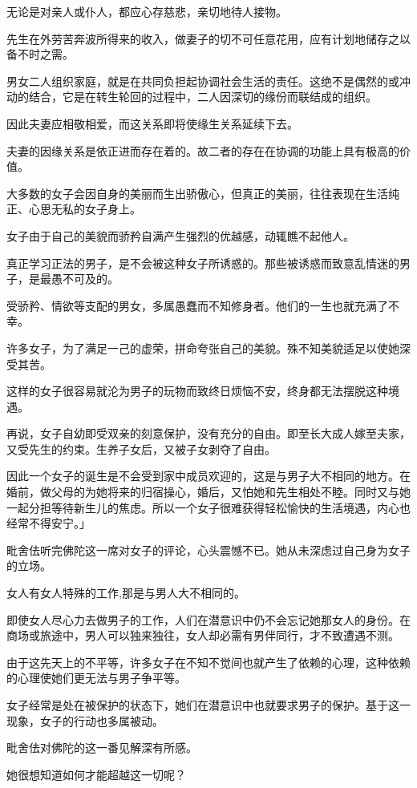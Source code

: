 \documentclass[twoside,openany]{book}
\begin{document}
无论是对亲人或仆人，都应心存慈悲，亲切地待人接物。

先生在外劳苦奔波所得来的收入，做妻子的切不可任意花用，应有计划地储存之以备不时之需。

男女二人组织家庭，就是在共同负担起协调社会生活的责任。这绝不是偶然的或冲动的结合，它是在转生轮回的过程中，二人因深切的缘份而联结成的组织。

因此夫妻应相敬相爱，而这关系即将使缘生关系延续下去。

夫妻的因缘关系是依正进而存在着的。故二者的存在在协调的功能上具有极高的价值。

大多数的女子会因自身的美丽而生出骄傲心，但真正的美丽，往往表现在生活纯正、心思无私的女子身上。

女子由于自己的美貌而骄矜自满产生强烈的优越感，动辄瞧不起他人。

真正学习正法的男子，是不会被这种女子所诱惑的。那些被诱惑而致意乱情迷的男子，是最愚不可及的。

受骄矜、情欲等支配的男女，多属愚蠢而不知修身者。他们的一生也就充满了不幸。

许多女子，为了满足一己的虚荣，拼命夸张自己的美貌。殊不知美貌适足以使她深受其苦。

这样的女子很容易就沦为男子的玩物而致终日烦恼不安，终身都无法摆脱这种境遇。

再说，女子自幼即受双亲的刻意保护，没有充分的自由。即至长大成人嫁至夫家，又受先生的约束。生养子女后，又被子女剥夺了自由。

因此一个女子的诞生是不会受到家中成员欢迎的，这是与男子大不相同的地方。在婚前，做父母的为她将来的归宿操心，婚后，又怕她和先生相处不睦。同时又与她一起分担等待新生儿的焦虑。所以一个女子很难获得轻松愉快的生活境遇，内心也经常不得安宁。」

毗舍佉听完佛陀这一席对女子的评论，心头震憾不已。她从未深虑过自己身为女子的立场。

女人有女人特殊的工作,那是与男人大不相同的。

即使女人尽心力去做男子的工作，人们在潜意识中仍不会忘记她那女人的身份。在商场或旅途中，男人可以独来独往，女人却必需有男伴同行，才不致遭遇不测。

由于这先天上的不平等，许多女子在不知不觉间也就产生了依赖的心理，这种依赖的心理使她们更无法与男子争平等。

女子经常是处在被保护的状态下，她们在潜意识中也就要求男子的保护。基于这一现象，女子的行动也多属被动。

毗舍佉对佛陀的这一番见解深有所感。

她很想知道如何才能超越这一切呢？
\end{document}
